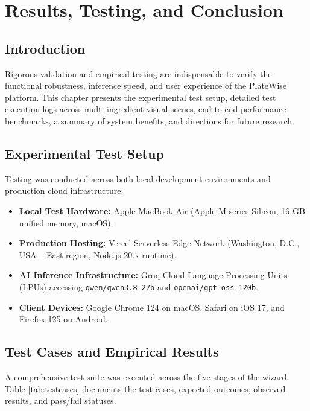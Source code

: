 \chapter{Results, Testing, and Conclusion}

\section{Introduction}
Rigorous validation and empirical testing are indispensable to verify the functional robustness, inference speed, and user experience of the PlateWise platform. This chapter presents the experimental test setup, detailed test execution logs across multi-ingredient visual scenes, end-to-end performance benchmarks, a summary of system benefits, and directions for future research.

\section{Experimental Test Setup}
Testing was conducted across both local development environments and production cloud infrastructure:
\begin{itemize}
    \item \textbf{Local Test Hardware:} Apple MacBook Air (Apple M-series Silicon, 16 GB unified memory, macOS).
    \item \textbf{Production Hosting:} Vercel Serverless Edge Network (Washington, D.C., USA -- East region, Node.js 20.x runtime).
    \item \textbf{AI Inference Infrastructure:} Groq Cloud Language Processing Units (LPUs) accessing \texttt{qwen/qwen3.8-27b} and \texttt{openai/gpt-oss-120b}.
    \item \textbf{Client Devices:} Google Chrome 124 on macOS, Safari on iOS 17, and Firefox 125 on Android.
\end{itemize}

\section{Test Cases and Empirical Results}
A comprehensive test suite was executed across the five stages of the wizard. Table \ref{tab:testcases} documents the test cases, expected outcomes, observed results, and pass/fail statuses.

